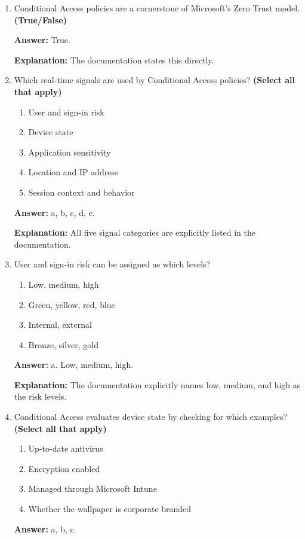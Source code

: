 \documentclass[10pt]{article}
\begin{document}
\begin{enumerate}[leftmargin=*]
\textbf{Answer:} True.

\textbf{Explanation:} This is the exact definition given at the start of the Conditional Access section.

\item Conditional Access policies are a cornerstone of Microsoft’s Zero Trust model. \textbf{(True/False)}

\textbf{Answer:} True.

\textbf{Explanation:} The documentation states this directly.

\item Which real-time signals are used by Conditional Access policies? \textbf{(Select all that apply)}
\begin{enumerate}[label=\alph*., leftmargin=1.5em]
\item User and sign-in risk
\item Device state
\item Application sensitivity
\item Location and IP address
\item Session context and behavior
\end{enumerate}
\textbf{Answer:} a, b, c, d, e.

\textbf{Explanation:} All five signal categories are explicitly listed in the documentation.

\item User and sign-in risk can be assigned as which levels?
\begin{enumerate}[label=\alph*., leftmargin=1.5em]
\item Low, medium, high
\item Green, yellow, red, blue
\item Internal, external
\item Bronze, silver, gold
\end{enumerate}
\textbf{Answer:} a. Low, medium, high.

\textbf{Explanation:} The documentation explicitly names low, medium, and high as the risk levels.

\item Conditional Access evaluates device state by checking for which examples? \textbf{(Select all that apply)}
\begin{enumerate}[label=\alph*., leftmargin=1.5em]
\item Up-to-date antivirus
\item Encryption enabled
\item Managed through Microsoft Intune
\item Whether the wallpaper is corporate branded
\end{enumerate}
\textbf{Answer:} a, b, c.


\end{enumerate}
\end{document}
